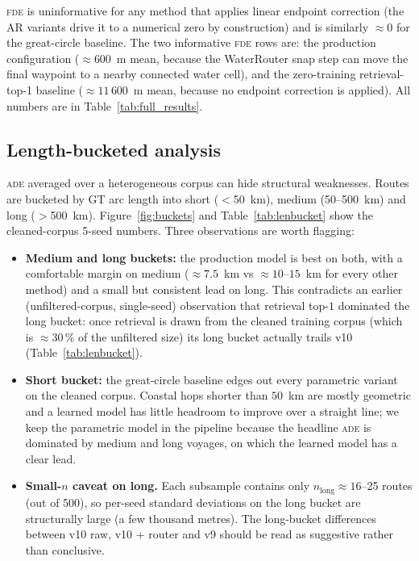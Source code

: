 \documentclass[oneside, a4paper, onecolumn, 11pt]{article}
\newcommand{\ade}{\textsc{ade}}
\newcommand{\fde}{\textsc{fde}}
\begin{document}
\fde{} is uninformative for any method that applies linear endpoint
correction (the AR variants drive it to a numerical zero by
construction) and is similarly $\approx 0$ for the great-circle
baseline.  The two informative \fde{} rows are: the production
configuration ($\approx 600$~m mean, because the WaterRouter snap step
can move the final waypoint to a nearby connected water cell), and
the zero-training retrieval-top-1 baseline ($\approx 11\,600$~m mean,
because no endpoint correction is applied).  All numbers are in
Table~\ref{tab:full_results}.

\subsection{Length-bucketed analysis}

\ade{} averaged over a heterogeneous corpus can hide structural
weaknesses.  Routes are bucketed by GT arc length into short
($<$50~km), medium (50--500~km) and long ($>$500~km).
Figure~\ref{fig:buckets} and Table~\ref{tab:lenbucket} show the
cleaned-corpus 5-seed numbers.  Three observations are worth
flagging:

\begin{itemize}[leftmargin=*]
  \item \textbf{Medium and long buckets:} the production model is
        best on both, with a comfortable margin on medium
        ($\approx 7.5$~km vs $\approx 10$--$15$~km for every other
        method) and a small but consistent lead on long.  This
        contradicts an earlier (unfiltered-corpus, single-seed)
        observation that retrieval top-$1$ dominated the long bucket:
        once retrieval is drawn from the cleaned training corpus
        (which is $\approx 30\,\%$ of the unfiltered size) its long
        bucket actually trails v10 (Table~\ref{tab:lenbucket}).
  \item \textbf{Short bucket:} the great-circle baseline edges out
        every parametric variant on the cleaned corpus.  Coastal
        hops shorter than $50$~km are mostly geometric and a learned
        model has little headroom to improve over a straight line;
        we keep the parametric model in the pipeline because the
        headline \ade{} is dominated by medium and long voyages, on
        which the learned model has a clear lead.
  \item \textbf{Small-$n$ caveat on long.}  Each subsample contains
        only $n_{\text{long}} \approx 16$--25 routes (out of 500), so
        per-seed standard deviations on the long bucket are
        structurally large (a few thousand metres).  The long-bucket
        differences between v10 raw, v10 + router and v9 should be
        read as suggestive rather than conclusive.
\end{itemize}
\end{document}
